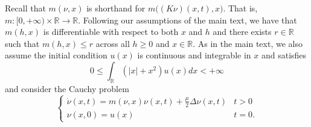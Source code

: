 \documentclass[]{article}
\begin{document}
Recall that \(m(\nu,x)\) is shorthand for \(m\big((K\nu)(x,t),x\big)\).
That is, \(m:[0,+\infty)\times\mathbb{R}\to\mathbb{R}\). Following our
assumptions of the main text, we have that \(m(h,x)\) is differentiable
with respect to both \(x\) and \(h\) and there exists \(r\in\mathbb{R}\)
such that \(m(h,x)\leq r\) across all \(h\geq0\) and \(x\in\mathbb{R}\).
As in the main text, we also assume the initial condition \(u(x)\) is
continuous and integrable in \(x\) and satisfies \begin{equation}
0\leq\int_{\mathbb{R}}(|x|+x^2)u(x)dx<+\infty
\end{equation} and consider the Cauchy problem
\begin{equation}\label{PDE_SM}
\left\{\begin{matrix}
\dot\nu(x,t)=m(\nu,x)\nu(x,t)+\frac{\mu}{2}\Delta\nu(x,t) & t>0\\
\nu(x,0)=u(x) & t=0.
\end{matrix}\right.
\end{equation}
\end{document}
